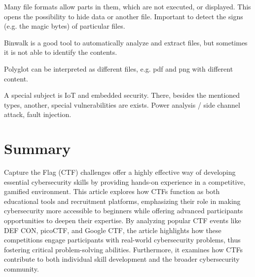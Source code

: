 \documentclass[conference]{IEEEtran}
\begin{document}
Many file formats allow parts in them, which are not executed, or displayed. This opens
the possibility to hide data or another file. Important to detect the signs (e.g. the
magic bytes) of particular files.

Binwalk is a good tool to automatically analyze and extract files, but sometimes it is
not able to identify the contents.

Polyglot can be interpreted as different files, e.g. pdf and png with different
content.

A special subject is IoT and embedded security. There, besides the mentioned
types, another, special vulnerabilities are exists. Power analysis / side channel
attack, fault injection.

\cite{butun2019}

\cite{ziade2004}


\section{Summary}

Capture the Flag (CTF) challenges offer a highly effective way of developing
essential cybersecurity skills by providing hands-on experience in a
competitive, gamified environment. This article explores how CTFs function as
both educational tools and recruitment platforms, emphasizing their role in
making cybersecurity more accessible to beginners while offering advanced
participants opportunities to deepen their expertise. By analyzing popular CTF
events like DEF CON, picoCTF, and Google CTF, the article highlights how these
competitions engage participants with real-world cybersecurity problems, thus
fostering critical problem-solving abilities. Furthermore, it examines how CTFs
contribute to both individual skill development and the broader cybersecurity
community.



\end{document}

